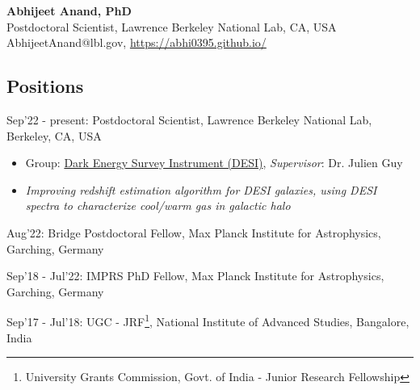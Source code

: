 \documentclass[12pt,letterpaper]{article}
\begin{document}
\thispagestyle{empty}\sloppy\sloppypar\raggedbottom

\textbf{\Large Abhijeet Anand, PhD}\\[0.5ex]
Postdoctoral Scientist, Lawrence Berkeley National Lab, CA, USA\\[0.5ex]
\textsf{\small AbhijeetAnand@lbl.gov, \href{https://abhi0395.github.io/}{https://abhi0395.github.io/}}\\[0.5ex]

\subsection{Positions}
\begin{list}{}{\cvlist}
\item Sep'22 - present: Postdoctoral Scientist, Lawrence Berkeley National Lab, Berkeley, CA, USA \\
\begin{itemize}
  \item Group: \href{https://www.desi.lbl.gov/}{Dark Energy Survey Instrument (DESI)}, \emph{Supervisor}: Dr. Julien Guy
  \item \emph{Improving redshift estimation algorithm for DESI galaxies, using DESI spectra to characterize cool/warm gas in galactic halo}
\end{itemize}
\item Aug'22: Bridge Postdoctoral Fellow, Max Planck Institute for Astrophysics, Garching, Germany
\item Sep'18 - Jul'22: IMPRS PhD Fellow, Max Planck Institute for Astrophysics, Garching, Germany
\item Sep'17 - Jul'18: UGC - JRF\footnote{University Grants Commission, Govt. of India - Junior Research Fellowship}, National Institute of Advanced Studies, Bangalore, India 
\end{list}
\end{document}
